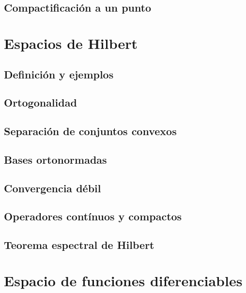\documentclass[12pt,]{krantz}
\theoremstyle{definition}
\theoremstyle{definition}
\theoremstyle{definition}
\theoremstyle{remark}
\begin{document}
\section{Compactificación a un punto}\label{compactificacion-a-un-punto}

\chapter{Espacios de Hilbert}\label{espacios-de-hilbert}

\section{Definición y ejemplos}\label{definicion-y-ejemplos-2}

\section{Ortogonalidad}\label{ortogonalidad}

\section{Separación de conjuntos
convexos}\label{separacion-de-conjuntos-convexos}

\section{Bases ortonormadas}\label{bases-ortonormadas}

\section{Convergencia débil}\label{convergencia-debil}

\section{Operadores contínuos y
compactos}\label{operadores-continuos-y-compactos}

\section{Teorema espectral de
Hilbert}\label{teorema-espectral-de-hilbert}

\chapter{Espacio de funciones
diferenciables}\label{espacio-de-funciones-diferenciables}
\end{document}
